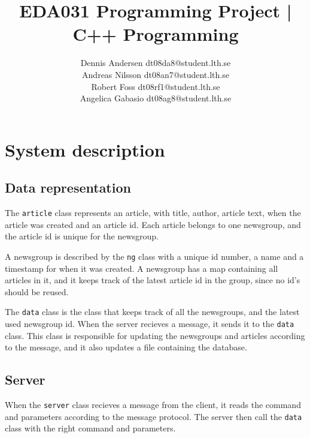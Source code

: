 \documentclass[12pt]{article}
\title{EDA031 Programming Project | C++ Programming}
\author{Dennis Andersen dt08da8@student.lth.se\\
Andreas Nilsson dt08an7@student.lth.se\\
Robert Foss dt08rf1@student.lth.se\\
Angelica Gabasio dt08ag8@student.lth.se}
\begin{document}
\maketitle
\newpage

\section{System description}

\subsection*{Data representation}
The \verb!article! class represents an article, with title, author, article text, when the article was created and an article id. Each article belongs to one newsgroup, and the article id is unique for the newsgroup.

A newsgroup is described by the \verb!ng! class with a unique id number, a name and a timestamp for when it was created. A newsgroup has a map containing all articles in it, and it keeps track of the latest article id in the group, since no id's should be reused.

The \verb!data! class is the class that keeps track of all the newsgroups, and the latest used newsgroup id. When the server recieves a message, it sends it to the \verb!data! class. This class is responsible for updating the newsgroups and articles according to the message, and it also updates a file containing the database.

\subsection*{Server}
When the \verb!server! class recieves a message from the client, it reads the command and parameters according to the message protocol. The server then call the \verb!data! class with the right command and parameters.
\end{document}
